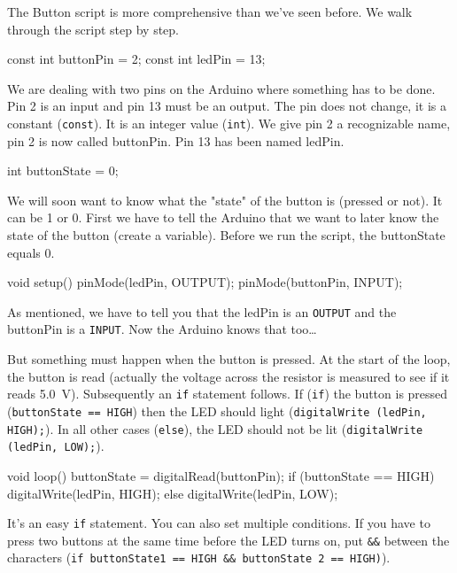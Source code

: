 \documentclass{arduino}
\begin{document}
The Button script is more comprehensive than we've seen before. We walk through the script step by step.

\begin{marginlisting}
const int buttonPin = 2;
const int ledPin = 13;
\end{marginlisting}

We are dealing with two pins on the Arduino where something has to be done. Pin 2 is an input and pin 13 must be an output. The pin does not change, it is a constant (\lstinline{const}). It is an integer value (\lstinline{int}). We give pin 2 a recognizable name, pin 2 is now called buttonPin. Pin 13 has been named ledPin.

\begin{marginlisting}
int buttonState = 0;
\end{marginlisting}

We will soon want to know what the "state" of the button is (pressed or not). It can be 1 or 0. First we have to tell the Arduino that we want to later know the state of the button (create a variable). Before we run the script, the buttonState equals 0.

\begin{marginlisting}
void setup() {
  pinMode(ledPin, OUTPUT);
  pinMode(buttonPin, INPUT);
}
\end{marginlisting}

As mentioned, we have to tell you that the ledPin is an \lstinline{OUTPUT} and the buttonPin is a \lstinline{INPUT}. Now the Arduino knows that too\dots

But something must happen when the button is pressed. At the start of the loop, the button is read (actually the voltage across the resistor is measured to see if it reads \SI{5.0}{\volt}). Subsequently an \lstinline{if} statement follows. If (\lstinline{if}) the button is pressed (\lstinline{buttonState == HIGH}) then the LED should light (\lstinline{digitalWrite (ledPin, HIGH);}). In all other cases (\lstinline{else}), the LED should not be lit (\lstinline{digitalWrite (ledPin, LOW);}).

\begin{marginlisting}
void loop() {
  buttonState = digitalRead(buttonPin);
  if (buttonState == HIGH) {
    digitalWrite(ledPin, HIGH);
  }
  else {
    digitalWrite(ledPin, LOW);
  }
}
\end{marginlisting}

It's an easy \lstinline{if} statement. You can also set multiple conditions. If you have to press two buttons at the same time before the LED turns on, put \lstinline{&&} between the characters (\lstinline{if buttonState1 == HIGH && buttonState 2 == HIGH)}).
\end{document}
